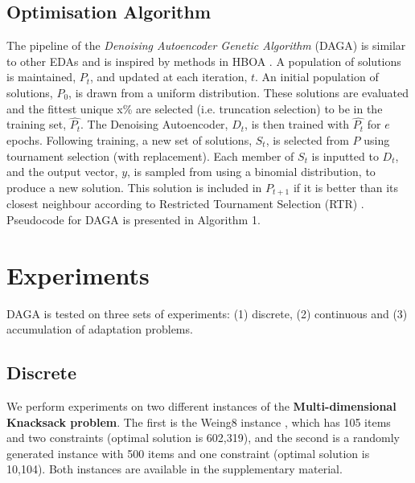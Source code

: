 \documentclass[runningheads,a4paper]{llncs}
\begin{document}
\subsection{Optimisation Algorithm}

The pipeline of the \emph{Denoising Autoencoder Genetic Algorithm} (DAGA) is similar to other EDAs and is inspired by methods in HBOA \cite{hboa}. A population of solutions is maintained, \(P_t\), and updated at each iteration, \(t\). An initial population of solutions, \(P_0\), is drawn from a uniform distribution. These solutions are evaluated and the fittest unique x\% are selected (i.e. truncation selection) to be in the training set, \(\hat{P_t}\). The Denoising Autoencoder, \(D_t\), is then trained with \(\hat{P_t}\) for \(e\) epochs. Following training, a new set of solutions, \(S_t\), is selected from \(P\) using tournament selection (with replacement). Each member of \(S_t\) is inputted to \(D_t\), and the output vector, \(y\), is sampled from using a binomial distribution, to produce a new solution. This solution is included in \(P_{t+1}\) if it is better than its closest neighbour according to Restricted Tournament Selection (RTR) \cite{hboa}. Pseudocode for DAGA is presented in Algorithm 1.

\section{Experiments}
\label{sec:experiments}
DAGA is tested on three sets of experiments: (1) discrete, (2) continuous and (3) accumulation of adaptation problems. 

\subsection{Discrete}
We perform experiments on two different instances of the \textbf{Multi-dimensional Knacksack problem}. The first is the Weing8 instance \cite{weingartner1967methods}, which has 105 items and two constraints (optimal solution is 602,319), and the second is a randomly generated instance with 500 items and one constraint (optimal solution is 10,104). Both instances are available in the supplementary material.
\end{document}
